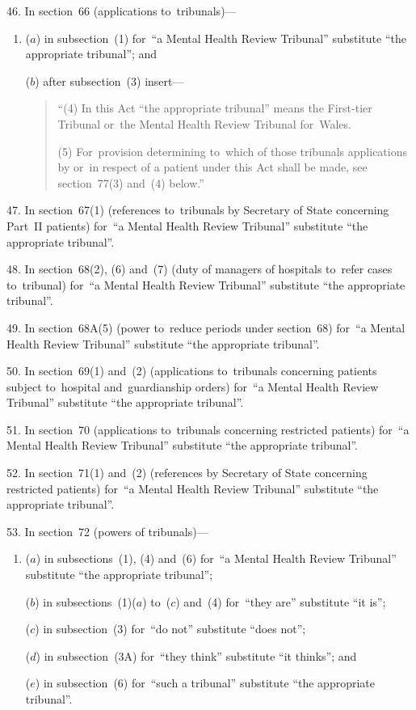 \documentclass[12pt,a4paper]{article}
\begin{document}
\medskip

46.  In section~66 (applications to~tribunals)—
\begin{enumerate}\item[]
($a$) in subsection~(1) for~“a Mental Health Review Tribunal” substitute “the appropriate tribunal”; and

($b$) after subsection~(3) insert—
\begin{quotation}
“(4) In this Act “the appropriate tribunal” means the First-tier Tribunal or~the Mental Health Review Tribunal for~Wales.

(5) For~provision determining to~which of those tribunals applications by or~in respect of a patient under this Act shall be made, see section~77(3) and~(4) below.”
\end{quotation}
\end{enumerate}

\medskip

47.  In section~67(1) (references to~tribunals by Secretary of State concerning Part~II patients) for~“a Mental Health Review Tribunal” substitute “the appropriate tribunal”.

\medskip

48.  In section~68(2), (6) and~(7) (duty of managers of hospitals to~refer cases to~tribunal) for~“a Mental Health Review Tribunal” substitute “the appropriate tribunal”.

\medskip

49.  In section~68A(5) (power to~reduce periods under section~68) for~“a Mental Health Review Tribunal” substitute “the appropriate tribunal”.

\medskip

50.  In section~69(1) and~(2) (applications to~tribunals concerning patients subject to~hospital and~guardianship orders) for~“a Mental Health Review Tribunal” substitute “the appropriate tribunal”.

\medskip

51.  In section~70 (applications to~tribunals concerning restricted patients) for~“a Mental Health Review Tribunal” substitute “the appropriate tribunal”.

\medskip

52.  In section~71(1) and~(2) (references by Secretary of State concerning restricted patients) for~“a Mental Health Review Tribunal” substitute “the appropriate tribunal”.

\medskip

53.  In section~72 (powers of tribunals)—
\begin{enumerate}\item[]
($a$) in subsections~(1), (4) and~(6) for~“a Mental Health Review Tribunal” substitute “the appropriate tribunal”;

($b$) in subsections~(1)($a$)  to~($c$)  and~(4) for~“they are” substitute “it is”;

($c$) in subsection~(3) for~“do not” substitute “does not”;

($d$) in subsection~(3A) for~“they think” substitute “it thinks”; and

($e$) in subsection~(6) for~“such a tribunal” substitute “the appropriate tribunal”.
\end{enumerate}
\end{document}
